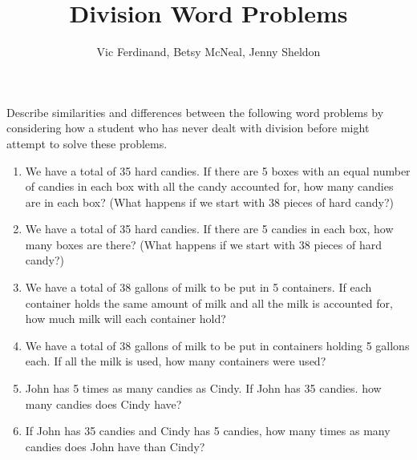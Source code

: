 \documentclass[nooutcomes,noauthor,handout]{ximera}
\title{Division Word Problems}
\author{Vic Ferdinand, Betsy McNeal, Jenny Sheldon}
\begin{document}
\begin{abstract} \end{abstract}
\maketitle



\begin{problem}
Describe similarities and differences between the following word problems by considering how a student who has never dealt with division before might attempt to solve these problems.

\begin{enumerate}
\item We have a total of 35 hard candies.  If there are 5 boxes with an equal number of candies in each box with all the candy accounted for, how many candies are in each box? (What happens if we start with 38 pieces of hard candy?)

\item We have a total of 35 hard candies.  If there are 5 candies in each box, how many boxes are there? (What happens if we start with 38 pieces of hard candy?)

\item We have a total of 38 gallons of milk to be put in 5 containers.  If each container holds the same amount of milk and all the milk is accounted for, how much milk will each container hold?

\item We have a total of 38 gallons of milk to be put in containers holding 5 gallons each.  If all the milk is used, how many containers were used?







\item John has 5 times as many candies as Cindy.  If John has 35 candies. how many candies does Cindy have?
\item If John has 35 candies and Cindy has 5 candies, how many times as many candies does John have than Cindy?
\end{enumerate}

\end{problem}
\end{document}
